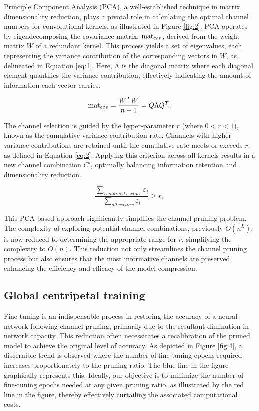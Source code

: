\documentclass[sigconf, 10pt]{acmart}
\begin{document}
Principle Component Analysis (PCA), a well-established technique in matrix dimensionality reduction, plays a pivotal role in calculating the optimal channel numbers for convolutional kernels, as illustrated in Figure \ref{fig:2}. PCA operates by eigendecomposing the covariance matrix, \({\rm mat}_{cov}\), derived from the weight matrix \( W \) of a redundant kernel. This process yields a set of eigenvalues, each representing the variance contribution of the corresponding vectors in \( W \), as delineated in Equation \ref{eq:1}. Here, \(\mathrm{\Lambda}\) is the diagonal matrix where each diagonal element quantifies the variance contribution, effectively indicating the amount of information each vector carries.

\begin{equation}
    {\rm mat}_{cov}=\frac{W^TW}{n-1}=Q\mathrm{\Lambda}Q^T,
    \label{eq:1}
\end{equation}

The channel selection is guided by the hyper-parameter \( r \) (where \( 0 < r < 1 \)), known as the cumulative variance contribution rate. Channels with higher variance contributions are retained until the cumulative rate meets or exceeds \( r \), as defined in Equation \ref{eq:2}. Applying this criterion across all kernels results in a new channel combination \( C' \), optimally balancing information retention and dimensionality reduction.


\begin{equation}
    \frac{\sum_{remained\ vectors}\varepsilon_i}{\sum_{all\ vectors}\varepsilon_i}\geq r,
    \label{eq:2}
\end{equation}

This PCA-based approach significantly simplifies the channel pruning problem. The complexity of exploring potential channel combinations, previously \( O(n^L) \), is now reduced to determining the appropriate range for \( r \), simplifying the complexity to \( O(n) \). This reduction not only streamlines the channel pruning process but also ensures that the most informative channels are preserved, enhancing the efficiency and efficacy of the model compression.

\subsection{Global centripetal training}

Fine-tuning is an indispensable process in restoring the accuracy of a neural network following channel pruning, primarily due to the resultant diminution in network capacity. This reduction often necessitates a recalibration of the pruned model to achieve the original level of accuracy. As depicted in Figure \ref{fig:4}, a discernible trend is observed where the number of fine-tuning epochs required increases proportionately to the pruning ratio. The blue line in the figure graphically represents this. Ideally, our objective is to minimize the number of fine-tuning epochs needed at any given pruning ratio, as illustrated by the red line in the figure, thereby effectively curtailing the associated computational costs.
\end{document}
